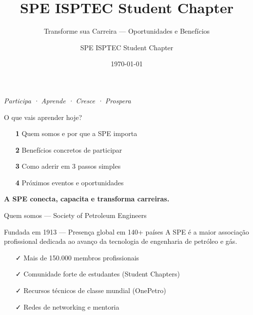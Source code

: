 \documentclass{beamer}
\title[SPE ISPTEC]{SPE ISPTEC Student Chapter}
\subtitle{Transforme sua Carreira — Oportunidades e Benefícios}
\author{SPE ISPTEC Student Chapter}
\date{\today}
\institute{ISPTEC — Instituto Superior Politécnico de Tecnologia e Ciências}
\begin{document}
{
\begin{frame}[plain]
  \titlepage
  \vspace{-2cm}
  \begin{center}
    {\small\color{spe-accent}\textit{Participa · Aprende · Cresce · Prospera}}
  \end{center}
\end{frame}
}

\begin{frame}{O que vais aprender hoje?}
  \begin{enumerate}
    \item[\color{spe-accent}\textbf{1}] Quem somos e por que a SPE importa
    \item[\color{spe-accent}\textbf{2}] Benefícios concretos de participar
    \item[\color{spe-accent}\textbf{3}] Como aderir em 3 passos simples
    \item[\color{spe-accent}\textbf{4}] Próximos eventos e oportunidades
  \end{enumerate}
  
  \vspace{1em}
  
  {\centering\color{spe-teal}\textbf{A SPE conecta, capacita e transforma carreiras.}}
\end{frame}

\begin{frame}{Quem somos — Society of Petroleum Engineers}
  \begin{block}{Fundada em 1913 — Presença global em 140+ países}
    A SPE é a maior associação profissional dedicada ao avanço da tecnologia de engenharia de petróleo e gás.
  \end{block}
  
  \vspace{0.8cm}
  
  \begin{itemize}[<+->]
    \item[\color{spe-accent}✓] Mais de 150.000 membros profissionais
    \item[\color{spe-accent}✓] Comunidade forte de estudantes (Student Chapters)
    \item[\color{spe-accent}✓] Recursos técnicos de classe mundial (OnePetro)
    \item[\color{spe-accent}✓] Redes de networking e mentoria
  \end{itemize}
\end{frame}
\end{document}
